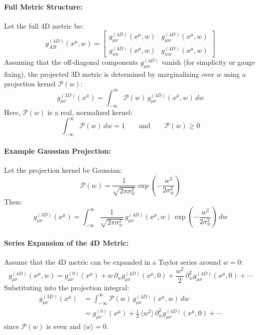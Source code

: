 \documentclass[12pt]{article}
\begin{document}
\paragraph{Full Metric Structure:}
Let the full 4D metric be:
\begin{equation}
g^{(4D)}_{AB}(x^\mu, w) =
\begin{bmatrix}
g^{(4D)}_{\mu\nu}(x^\mu, w) & g^{(4D)}_{\mu w}(x^\mu, w) \\
g^{(4D)}_{w \nu}(x^\mu, w) & g^{(4D)}_{ww}(x^\mu, w)
\end{bmatrix}
\end{equation}
Assuming that the off-diagonal components \(g^{(4D)}_{\mu w}\) vanish (for simplicity or gauge fixing), the projected 3D metric is determined by marginalizing over \(w\) using a projection kernel \(\mathcal{P}(w)\):
\begin{equation}
g^{(3D)}_{\mu\nu}(x^\mu) = \int_{-\infty}^{\infty} \mathcal{P}(w)\, g^{(4D)}_{\mu\nu}(x^\mu, w)\, dw
\end{equation}
Here, \(\mathcal{P}(w)\) is a real, normalized kernel:
\begin{equation}
\int_{-\infty}^{\infty} \mathcal{P}(w)\, dw = 1 \qquad \text{and} \qquad \mathcal{P}(w) \geq 0
\end{equation}

\paragraph{Example   Gaussian Projection:}
Let the projection kernel be Gaussian:
\begin{equation}
\mathcal{P}(w) = \frac{1}{\sqrt{2\pi \sigma_w^2}} \exp\left( -\frac{w^2}{2\sigma_w^2} \right)
\end{equation}
Then:
\begin{equation}
g^{(3D)}_{\mu\nu}(x^\mu) = \int_{-\infty}^{\infty} \frac{1}{\sqrt{2\pi \sigma_w^2}}\, g^{(4D)}_{\mu\nu}(x^\mu, w)\, \exp\left( -\frac{w^2}{2\sigma_w^2} \right)\, dw
\end{equation}

\paragraph{Series Expansion of the 4D Metric:}
Assume that the 4D metric can be expanded in a Taylor series around \(w = 0\):
\begin{equation}
g^{(4D)}_{\mu\nu}(x^\mu, w) = g^{(0)}_{\mu\nu}(x^\mu) + w\, \partial_w g^{(4D)}_{\mu\nu}(x^\mu, 0) + \frac{w^2}{2}\, \partial_w^2 g^{(4D)}_{\mu\nu}(x^\mu, 0) + \cdots
\end{equation}
Substituting into the projection integral:
\begin{align}
g^{(3D)}_{\mu\nu}(x^\mu) &= \int_{-\infty}^{\infty} \mathcal{P}(w)\, g^{(4D)}_{\mu\nu}(x^\mu, w)\, dw \\
&= g^{(0)}_{\mu\nu}(x^\mu) + \frac{1}{2}\, \langle w^2 \rangle\, \partial_w^2 g^{(4D)}_{\mu\nu}(x^\mu, 0) + \cdots
\end{align}
since \(\mathcal{P}(w)\) is even and \(\langle w \rangle = 0\).
\end{document}

